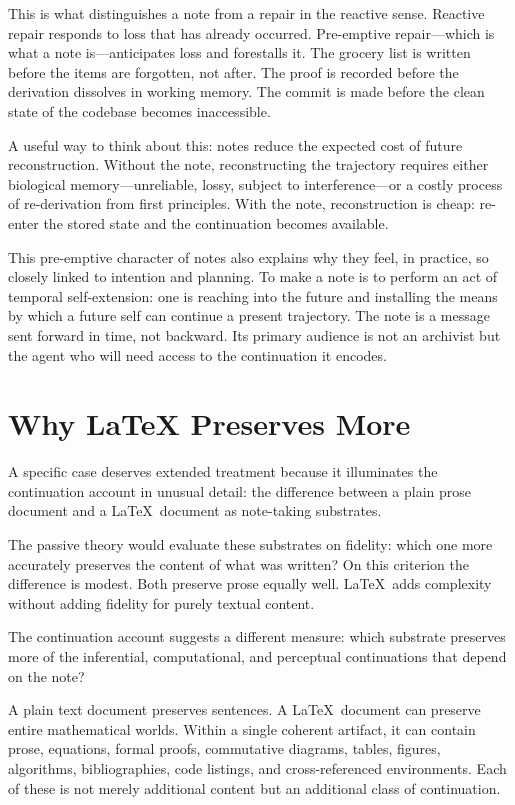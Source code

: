 \documentclass[12pt, a4paper]{article}
\begin{document}
This is what distinguishes a note from a repair in the reactive sense. Reactive
repair responds to loss that has already occurred. Pre-emptive repair---which is
what a note is---anticipates loss and forestalls it. The grocery list is written
before the items are forgotten, not after. The proof is recorded before the
derivation dissolves in working memory. The commit is made before the clean state
of the codebase becomes inaccessible.

A useful way to think about this: notes reduce the expected cost of future
reconstruction. Without the note, reconstructing the trajectory requires either
biological memory---unreliable, lossy, subject to interference---or a costly
process of re-derivation from first principles. With the note, reconstruction is
cheap: re-enter the stored state and the continuation becomes available.

This pre-emptive character of notes also explains why they feel, in practice, so
closely linked to intention and planning. To make a note is to perform an act of
temporal self-extension: one is reaching into the future and installing the means
by which a future self can continue a present trajectory. The note is a message
sent forward in time, not backward. Its primary audience is not an archivist but
the agent who will need access to the continuation it encodes.

\section{Why LaTeX Preserves More}

A specific case deserves extended treatment because it illuminates the
continuation account in unusual detail: the difference between a plain prose
document and a \LaTeX\ document as note-taking substrates.

The passive theory would evaluate these substrates on fidelity: which one more
accurately preserves the content of what was written? On this criterion the
difference is modest. Both preserve prose equally well. \LaTeX\ adds complexity
without adding fidelity for purely textual content.

The continuation account suggests a different measure: which substrate preserves
more of the inferential, computational, and perceptual continuations that depend
on the note?

A plain text document preserves sentences. A \LaTeX\ document can preserve entire
mathematical worlds. Within a single coherent artifact, it can contain prose,
equations, formal proofs, commutative diagrams, tables, figures, algorithms,
bibliographies, code listings, and cross-referenced environments. Each of these is
not merely additional content but an additional class of continuation.
\end{document}
